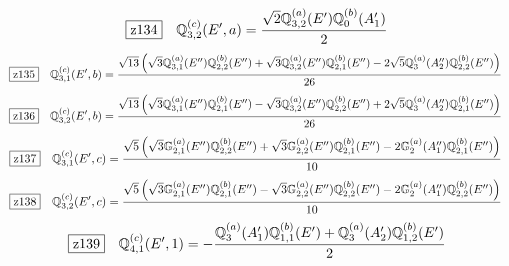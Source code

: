 \documentclass[fleqn,10pt,landscape]{jsarticle}
\begin{document}
\begin{dmath*}
\hspace*{3mm}\fbox{z134}\quad \mathbb{Q}_{3,2}^{(c)}(E^{\prime},a)=\frac{\sqrt{2} \mathbb{Q}_{3,2}^{(a)}(E^{\prime}) \mathbb{Q}_{0}^{(b)}(A_{1}^{\prime})}{2}
\end{dmath*}
\begin{dmath*}
\hspace*{3mm}\fbox{z135}\quad \mathbb{Q}_{3,1}^{(c)}(E^{\prime},b)=\frac{\sqrt{13} \left(\sqrt{3} \mathbb{Q}_{3,1}^{(a)}(E^{\prime\prime}) \mathbb{Q}_{2,2}^{(b)}(E^{\prime\prime}) + \sqrt{3} \mathbb{Q}_{3,2}^{(a)}(E^{\prime\prime}) \mathbb{Q}_{2,1}^{(b)}(E^{\prime\prime}) - 2 \sqrt{5} \mathbb{Q}_{3}^{(a)}(A_{2}^{\prime\prime}) \mathbb{Q}_{2,2}^{(b)}(E^{\prime\prime})\right)}{26}
\end{dmath*}
\begin{dmath*}
\hspace*{3mm}\fbox{z136}\quad \mathbb{Q}_{3,2}^{(c)}(E^{\prime},b)=\frac{\sqrt{13} \left(\sqrt{3} \mathbb{Q}_{3,1}^{(a)}(E^{\prime\prime}) \mathbb{Q}_{2,1}^{(b)}(E^{\prime\prime}) - \sqrt{3} \mathbb{Q}_{3,2}^{(a)}(E^{\prime\prime}) \mathbb{Q}_{2,2}^{(b)}(E^{\prime\prime}) + 2 \sqrt{5} \mathbb{Q}_{3}^{(a)}(A_{2}^{\prime\prime}) \mathbb{Q}_{2,1}^{(b)}(E^{\prime\prime})\right)}{26}
\end{dmath*}
\begin{dmath*}
\hspace*{3mm}\fbox{z137}\quad \mathbb{Q}_{3,1}^{(c)}(E^{\prime},c)=\frac{\sqrt{5} \left(\sqrt{3} \mathbb{G}_{2,1}^{(a)}(E^{\prime\prime}) \mathbb{Q}_{2,2}^{(b)}(E^{\prime\prime}) + \sqrt{3} \mathbb{G}_{2,2}^{(a)}(E^{\prime\prime}) \mathbb{Q}_{2,1}^{(b)}(E^{\prime\prime}) - 2 \mathbb{G}_{2}^{(a)}(A_{1}^{\prime\prime}) \mathbb{Q}_{2,1}^{(b)}(E^{\prime\prime})\right)}{10}
\end{dmath*}
\begin{dmath*}
\hspace*{3mm}\fbox{z138}\quad \mathbb{Q}_{3,2}^{(c)}(E^{\prime},c)=\frac{\sqrt{5} \left(\sqrt{3} \mathbb{G}_{2,1}^{(a)}(E^{\prime\prime}) \mathbb{Q}_{2,1}^{(b)}(E^{\prime\prime}) - \sqrt{3} \mathbb{G}_{2,2}^{(a)}(E^{\prime\prime}) \mathbb{Q}_{2,2}^{(b)}(E^{\prime\prime}) - 2 \mathbb{G}_{2}^{(a)}(A_{1}^{\prime\prime}) \mathbb{Q}_{2,2}^{(b)}(E^{\prime\prime})\right)}{10}
\end{dmath*}
\begin{dmath*}
\hspace*{3mm}\fbox{z139}\quad \mathbb{Q}_{4,1}^{(c)}(E^{\prime},1)=- \frac{\mathbb{Q}_{3}^{(a)}(A_{1}^{\prime}) \mathbb{Q}_{1,1}^{(b)}(E^{\prime}) + \mathbb{Q}_{3}^{(a)}(A_{2}^{\prime}) \mathbb{Q}_{1,2}^{(b)}(E^{\prime})}{2}
\end{dmath*}
\end{document}
